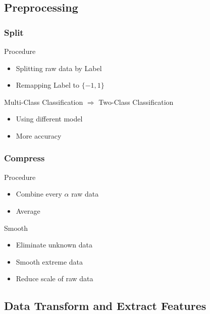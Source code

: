 \documentclass[11pt,slidestop,mathserif,compress]{beamer}
\begin{document}
\subsection{Preprocessing}
\begin{frame}
	\frametitle{Split}
	\begin{block}{Procedure}
		\begin{itemize}
			\item	Splitting raw data by Label
			\item	Remapping Label to $\{-1, 1\}$
		\end{itemize}
	\end{block}
	\pause
	\begin{exampleblock}{Multi-Class Classification $\Rightarrow$ Two-Class Classification}
		\begin{itemize}
			\item	Using different model
			\item	More accuracy
		\end{itemize}
	\end{exampleblock}
\end{frame}

\begin{frame}
	\frametitle{Compress}
	\begin{block}{Procedure}
		\begin{itemize}
			\item	Combine every $\alpha$ raw data
			\item	Average
		\end{itemize}
	\end{block}
	\pause
	\begin{exampleblock}{Smooth}
		\begin{itemize}
			\item	Eliminate unknown data
			\item	Smooth extreme data
			\item	Reduce scale of raw data
		\end{itemize}
	\end{exampleblock}
\end{frame}

\subsection{Data Transform and Extract Features}
\end{document}
